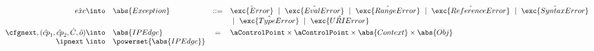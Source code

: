 \[\begin{array}{rlcl}
\hat{exc}\into& \abs{Exception} & ::= & \hat{\exc{Error}} ~\mid~
                                      \hat{\exc{EvalError}} ~\mid~
                                      \hat{\exc{RangeError}} ~\mid~
                                      \hat{\exc{ReferenceError}} ~\mid~
                                      \hat{\exc{SyntaxError}} \\
                                & & & ~\mid~
                                      \hat{\exc{TypeError}} ~\mid~ 
                                      \hat{\exc{URIError}} \vspace{1mm}\\

\cfgnext, (\hat{cp}_1, \hat{cp}_2, \hat{C}, \hat{o}) \into & \abs{IPEdge} & = &
    \aControlPoint \times \aControlPoint \times \abs{Context} \times \abs{Obj} \\
\ipnext\ \into & \powerset{\abs{IPEdge}} & & \\

\end{array}
\]

\newpage
